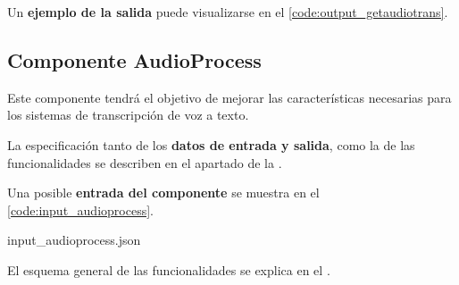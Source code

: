 \documentclass[../main.tex]{subfiles}
\begin{document}
Un \textbf{ejemplo de la salida} puede visualizarse en el \autoref{code:output_getaudiotrans}.



\subsection{Componente AudioProcess}\label{subsec:impl_audioprocess}
Este componente tendrá el objetivo de mejorar las características necesarias para los sistemas de transcripción de voz a texto.

La especificación tanto de los \textbf{datos de entrada y salida}, como la de las funcionalidades se describen en el apartado  de la .

Una posible \textbf{entrada del componente} se muestra en el \autoref{code:input_audioprocess}.

                {input_audioprocess.json}


El esquema general de las funcionalidades se explica en el .
\end{document}
